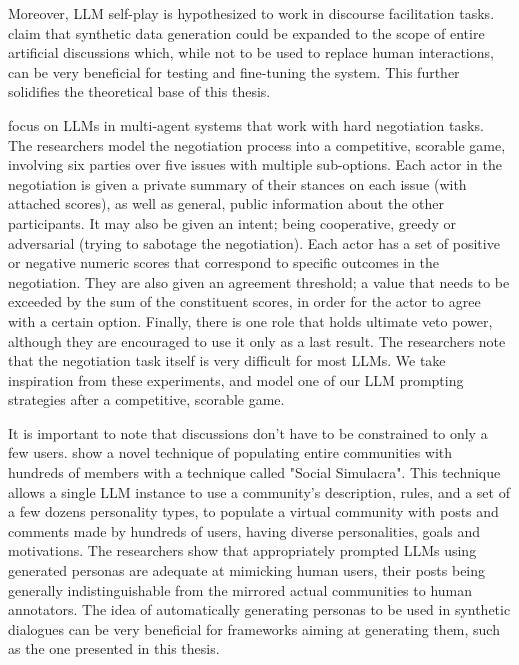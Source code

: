 Moreover, LLM self-play is hypothesized to work in discourse facilitation tasks. \citet{small-polis-llm} claim that synthetic data generation could be expanded to the scope of entire artificial discussions which, while not to be used to replace human interactions, can be very beneficial for testing and fine-tuning the system. This further solidifies the theoretical base of this thesis. 


\citet{abdelnabi2024cooperationcompetitionmaliciousnessllmstakeholders} focus on LLMs in multi-agent systems that work with hard negotiation tasks. The researchers model the negotiation process into a competitive, scorable game, involving six parties over five issues with multiple sub-options. Each actor in the negotiation is given a private summary of their stances on each issue (with attached scores), as well as general, public information about the other participants. It may also be given an intent; being cooperative, greedy or adversarial (trying to sabotage the negotiation). Each actor has a set of positive or negative numeric scores that correspond to specific outcomes in the negotiation. They are also given an agreement threshold; a value that needs to be exceeded by the sum of the constituent scores, in order for the actor to agree with a certain option. Finally, there is one role that holds ultimate veto power, although they are encouraged to use it only as a last result. The researchers note that the negotiation task itself is very difficult for most LLMs. We take inspiration from these experiments, and model one of our LLM prompting strategies after a competitive, scorable game.

It is important to note that discussions don't have to be constrained to only a few users. \citet{park2022socialsimulacracreatingpopulated} show a novel technique of populating entire communities with hundreds of members with a technique called "Social Simulacra". This technique allows a single LLM instance to use a community's description, rules, and a set of a few dozens personality types, to populate a virtual community with posts and comments made by hundreds of users, having diverse personalities, goals and motivations. The researchers show that appropriately prompted LLMs using generated personas are adequate at mimicking human users, their posts being generally indistinguishable from the mirrored actual communities to human annotators. The idea of automatically generating personas to be used in synthetic dialogues can be very beneficial for frameworks aiming at generating them, such as the one presented in this thesis.

